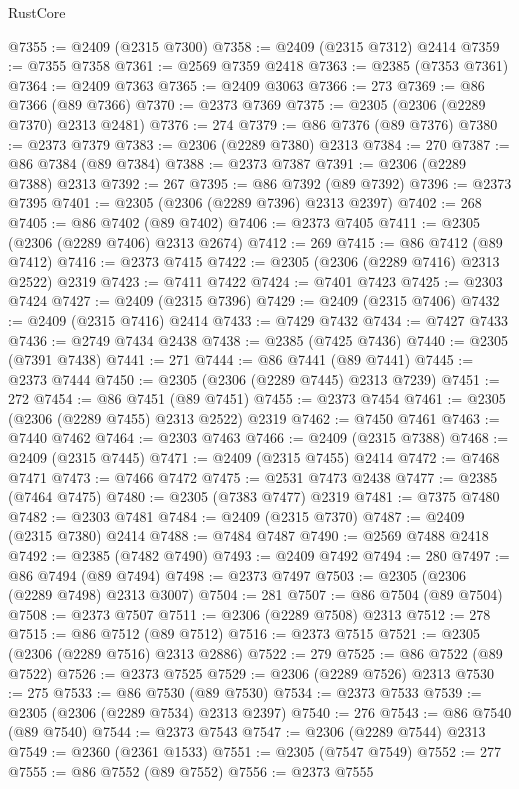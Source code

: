 \begin{lexlean}{RustCore}
\begin{coremodule}
@7355 := @2409 (@2315 @7300)
@7358 := @2409 (@2315 @7312) @2414
@7359 := @7355 @7358
@7361 := @2569 @7359 @2418
@7363 := @2385 (@7353 @7361)
@7364 := @2409 @7363
@7365 := @2409 @3063
@7366 := 273
@7369 := @86 @7366 (@89 @7366)
@7370 := @2373 @7369
@7375 := @2305 (@2306 (@2289 @7370) @2313 @2481)
@7376 := 274
@7379 := @86 @7376 (@89 @7376)
@7380 := @2373 @7379
@7383 := @2306 (@2289 @7380) @2313
@7384 := 270
@7387 := @86 @7384 (@89 @7384)
@7388 := @2373 @7387
@7391 := @2306 (@2289 @7388) @2313
@7392 := 267
@7395 := @86 @7392 (@89 @7392)
@7396 := @2373 @7395
@7401 := @2305 (@2306 (@2289 @7396) @2313 @2397)
@7402 := 268
@7405 := @86 @7402 (@89 @7402)
@7406 := @2373 @7405
@7411 := @2305 (@2306 (@2289 @7406) @2313 @2674)
@7412 := 269
@7415 := @86 @7412 (@89 @7412)
@7416 := @2373 @7415
@7422 := @2305 (@2306 (@2289 @7416) @2313 @2522) @2319
@7423 := @7411 @7422
@7424 := @7401 @7423
@7425 := @2303 @7424
@7427 := @2409 (@2315 @7396)
@7429 := @2409 (@2315 @7406)
@7432 := @2409 (@2315 @7416) @2414
@7433 := @7429 @7432
@7434 := @7427 @7433
@7436 := @2749 @7434 @2438
@7438 := @2385 (@7425 @7436)
@7440 := @2305 (@7391 @7438)
@7441 := 271
@7444 := @86 @7441 (@89 @7441)
@7445 := @2373 @7444
@7450 := @2305 (@2306 (@2289 @7445) @2313 @7239)
@7451 := 272
@7454 := @86 @7451 (@89 @7451)
@7455 := @2373 @7454
@7461 := @2305 (@2306 (@2289 @7455) @2313 @2522) @2319
@7462 := @7450 @7461
@7463 := @7440 @7462
@7464 := @2303 @7463
@7466 := @2409 (@2315 @7388)
@7468 := @2409 (@2315 @7445)
@7471 := @2409 (@2315 @7455) @2414
@7472 := @7468 @7471
@7473 := @7466 @7472
@7475 := @2531 @7473 @2438
@7477 := @2385 (@7464 @7475)
@7480 := @2305 (@7383 @7477) @2319
@7481 := @7375 @7480
@7482 := @2303 @7481
@7484 := @2409 (@2315 @7370)
@7487 := @2409 (@2315 @7380) @2414
@7488 := @7484 @7487
@7490 := @2569 @7488 @2418
@7492 := @2385 (@7482 @7490)
@7493 := @2409 @7492
@7494 := 280
@7497 := @86 @7494 (@89 @7494)
@7498 := @2373 @7497
@7503 := @2305 (@2306 (@2289 @7498) @2313 @3007)
@7504 := 281
@7507 := @86 @7504 (@89 @7504)
@7508 := @2373 @7507
@7511 := @2306 (@2289 @7508) @2313
@7512 := 278
@7515 := @86 @7512 (@89 @7512)
@7516 := @2373 @7515
@7521 := @2305 (@2306 (@2289 @7516) @2313 @2886)
@7522 := 279
@7525 := @86 @7522 (@89 @7522)
@7526 := @2373 @7525
@7529 := @2306 (@2289 @7526) @2313
@7530 := 275
@7533 := @86 @7530 (@89 @7530)
@7534 := @2373 @7533
@7539 := @2305 (@2306 (@2289 @7534) @2313 @2397)
@7540 := 276
@7543 := @86 @7540 (@89 @7540)
@7544 := @2373 @7543
@7547 := @2306 (@2289 @7544) @2313
@7549 := @2360 (@2361 @1533)
@7551 := @2305 (@7547 @7549)
@7552 := 277
@7555 := @86 @7552 (@89 @7552)
@7556 := @2373 @7555

\end{coremodule}
\end{lexlean}
